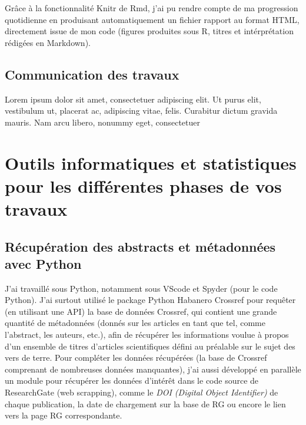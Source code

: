 \documentclass{book}
\begin{document}
Grâce à la fonctionnalité Knitr de Rmd, j'ai pu rendre compte de ma progression
quotidienne en produisant automatiquement un fichier rapport au format HTML,
directement issue de mon code (figures produites sous R, titres et
intérprétation rédigées en Markdown).

\subsection{Communication des travaux}
\noindent
Lorem ipsum dolor sit amet, consectetuer adipiscing elit. Ut purus elit,
vestibulum ut, placerat ac,
adipiscing vitae, felis. Curabitur dictum gravida mauris. Nam arcu libero,
nonummy eget, consectetuer

\thispagestyle{fancy}

\section[Outils informatiques et statistiques]{Outils informatiques et
  statistiques pour les différentes phases de vos travaux}

\subsection{Récupération des abstracts et métadonnées avec Python}
\noindent
J'ai travaillé sous Python, notamment sous VScode et Spyder (pour le code
Python). J'ai surtout utilisé le package Python Habanero Crossref pour requêter
(en utilisant une API) la base de données Crossref, qui contient une grande
quantité de métadonnées (donnés sur les articles en tant que tel, comme
l'abstract, les auteurs, etc.), afin de récupérer les informations voulue à
propos d'un ensemble de titres d'articles scientifiques défini au préalable sur
le sujet des vers de terre. Pour compléter les données récupérées (la base de
Crossref comprenant de nombreuses données manquantes), j'ai aussi développé en
parallèle un module pour récupérer les données d'intérêt dans le code source de
ResearchGate (web scrapping), comme le \textit{DOI (Digital Object Identifier)}
de chaque publication, la date de chargement sur la base de RG ou encore le
lien vers la page RG correspondante.
\end{document}
